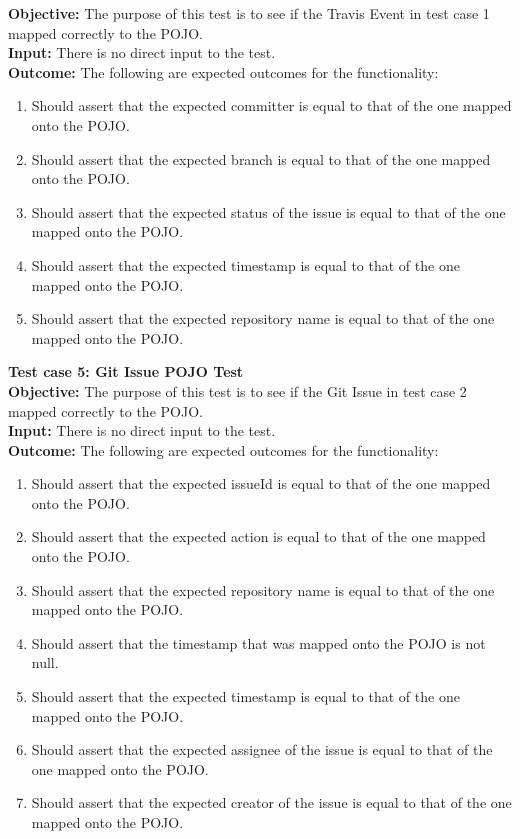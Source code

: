 \documentclass[11pt,a4paper]{article}
\begin{document}
\textbf{Objective: } The purpose of this test is to see if the Travis Event in test case 1 mapped correctly to the POJO. \\
\textbf{Input: } There is no direct input to the test. \\
\textbf{Outcome: } The following are expected outcomes for the functionality:
\begin{enumerate}
	\item Should assert that the expected committer is equal to that of the one mapped onto the POJO.
	\item Should assert that the expected branch is equal to that of the one mapped onto the POJO.
	\item Should assert that the expected status of the issue is equal to that of the one mapped onto the POJO.
	\item Should assert that the expected timestamp is equal to that of the one mapped onto the POJO.
	\item Should assert that the expected repository name is equal to that of the one mapped onto the POJO.\\
\end{enumerate}
\noindent
\textbf{Test case 5: Git Issue POJO Test} \\
\textbf{Objective: } The purpose of this test is to see if the Git Issue in test case 2 mapped correctly to the POJO. \\
\textbf{Input: } There is no direct input to the test. \\
\textbf{Outcome: } The following are expected outcomes for the functionality:
\begin{enumerate}
	\item Should assert that the expected issueId is equal to that of the one mapped onto the POJO.
	\item Should assert that the expected action is equal to that of the one mapped onto the POJO.
	\item Should assert that the expected repository name is equal to that of the one mapped onto the POJO.
	\item Should assert that the timestamp that was mapped onto the POJO is not null.
	\item Should assert that the expected timestamp is equal to that of the one mapped onto the POJO.
	\item Should assert that the expected assignee of the issue is equal to that of the one mapped onto the POJO.
	\item Should assert that the expected creator of the issue is equal to that of the one mapped onto the POJO.\\
\end{enumerate}
\end{document}
